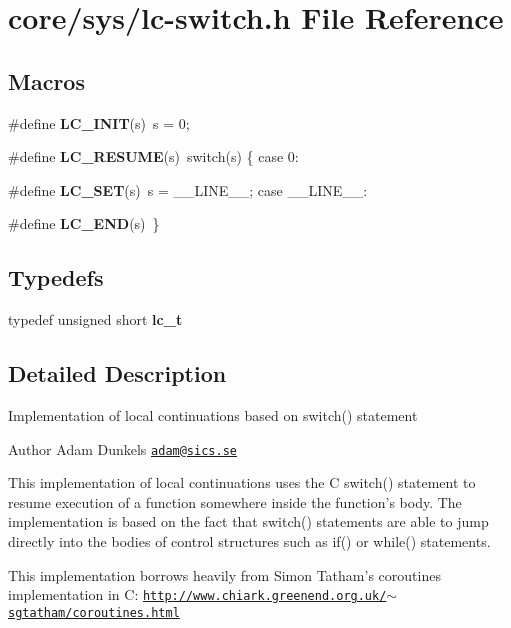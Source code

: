 \hypertarget{lc-switch_8h}{\section{core/sys/lc-\/switch.h File Reference}
\label{lc-switch_8h}
}
\subsection*{Macros}
\begin{DoxyCompactItemize}
\item 
\hypertarget{group__lc_ga2c1bb4fa6d7a6ff951a41c73fc721109}{\#define {\bfseries L\-C\-\_\-\-I\-N\-I\-T}(s)~s = 0;}\label{group__lc_ga2c1bb4fa6d7a6ff951a41c73fc721109}

\item 
\hypertarget{group__lc_ga1ec8b8f4710dce1fa7fb87d3a31541ae}{\#define {\bfseries L\-C\-\_\-\-R\-E\-S\-U\-M\-E}(s)~switch(s) \{ case 0\-:}\label{group__lc_ga1ec8b8f4710dce1fa7fb87d3a31541ae}

\item 
\hypertarget{group__lc_gad8eec328a4868d767f0c00c8d1c6cfc1}{\#define {\bfseries L\-C\-\_\-\-S\-E\-T}(s)~s = \-\_\-\-\_\-\-L\-I\-N\-E\-\_\-\-\_\-; case \-\_\-\-\_\-\-L\-I\-N\-E\-\_\-\-\_\-\-:}\label{group__lc_gad8eec328a4868d767f0c00c8d1c6cfc1}

\item 
\hypertarget{group__lc_gaca51ceb2f5d855dfde55bcedf8d3b92d}{\#define {\bfseries L\-C\-\_\-\-E\-N\-D}(s)~\}}\label{group__lc_gaca51ceb2f5d855dfde55bcedf8d3b92d}

\end{DoxyCompactItemize}
\subsection*{Typedefs}
\begin{DoxyCompactItemize}
\item 
\hypertarget{group__lc_ga3983e0c026396d5c4506779d770007ba}{typedef unsigned short {\bfseries lc\-\_\-t}}\label{group__lc_ga3983e0c026396d5c4506779d770007ba}

\end{DoxyCompactItemize}


\subsection{Detailed Description}
Implementation of local continuations based on switch() statement \begin{DoxyAuthor}{Author}
Adam Dunkels \href{mailto:adam@sics.se}{\tt adam@sics.\-se}
\end{DoxyAuthor}
This implementation of local continuations uses the C switch() statement to resume execution of a function somewhere inside the function's body. The implementation is based on the fact that switch() statements are able to jump directly into the bodies of control structures such as if() or while() statements.

This implementation borrows heavily from Simon Tatham's coroutines implementation in C\-: \href{http://www.chiark.greenend.org.uk/~sgtatham/coroutines.html}{\tt http\-://www.\-chiark.\-greenend.\-org.\-uk/$\sim$sgtatham/coroutines.\-html} 